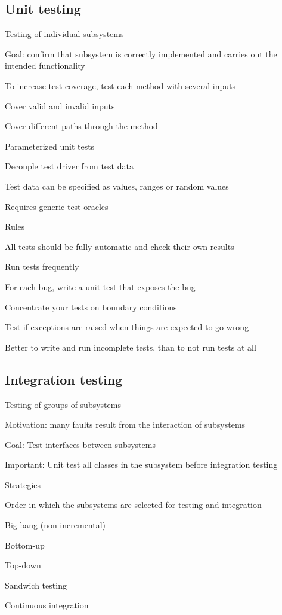 \documentclass[10pt]{article}
\begin{document}
\subsection{Unit testing}
\enumstart
	\item Testing of individual subsystems
	\item Goal: confirm that subsystem is correctly implemented and carries out the intended functionality
	\item To increase test coverage, test each method with several inputs
	\enumstart
		\item Cover valid and invalid inputs
		\item Cover different paths through the method
	\enumend
	\item Parameterized unit tests
	\enumstart
		\item Decouple test driver from test data
		\item Test data can be specified as values, ranges or random values
		\item Requires generic test oracles
	\enumend
	\item Rules
	\enumstart
		\item All tests should be fully automatic and check their own results
		\item Run tests frequently
		\item For each bug, write a unit test that exposes the bug
		\item Concentrate your tests on boundary conditions
		\item Test if exceptions are raised when things are expected to go wrong
		\item Better to write and run incomplete tests, than to not run tests at all
	\enumend
\enumend

\subsection{Integration testing}
\enumstart
	\item Testing of groups of subsystems
	\item Motivation: many faults result from the interaction of subsystems
	\item Goal: Test interfaces between subsystems
	\item Important: Unit test all classes in the subsystem before integration testing
	\item Strategies
	\enumstart
		\item Order in which the subsystems are selected for testing and integration
		\item Big-bang (non-incremental)
		\item Bottom-up
		\item Top-down
		\item Sandwich testing
		\item Continuous integration
	\enumend
\enumend
\end{document}
